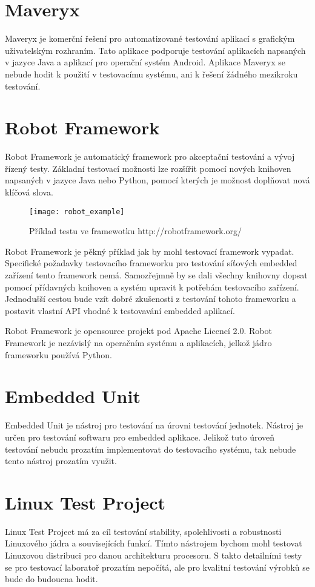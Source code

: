 \section{Maveryx}
Maveryx je komerční řešení pro automatizované testování aplikací s grafickým uživatelským rozhraním. Tato aplikace podporuje testování aplikacích napsaných v jazyce Java a aplikací pro operační systém Android. Aplikace Maveryx se nebude hodit k použití v testovacímu systému, ani k řešení žádného mezikroku testování.

\section{Robot Framework}
Robot Framework je automatický framework pro akceptační testování a vývoj řízený testy. Základní testovací možnosti lze rozšířit pomocí nových knihoven napsaných v jazyce Java nebo Python, pomocí kterých je možnost doplňovat nová klíčová slova.

\begin{figure}[h]
  \centering
  \texttt{[image: robot\_example]}
  \caption{Příklad testu ve framewotku http://robotframework.org/}
  \label{fig:robot_example}
\end{figure}

Robot Framework je pěkný příklad jak by mohl testovací framework vypadat. Specifické požadavky testovacího frameworku pro testování síťových embedded zařízení tento framework nemá. Samozřejmně by se dali všechny knihovny dopsat pomocí přídavných knihoven a systém upravit k potřebám testovacího zařízení. Jednodušší cestou bude vzít dobré zkušenosti z testování tohoto frameworku a postavit vlastní API vhodné k testovavání embedded aplikací.

Robot Framework je opensource projekt pod Apache Licencí 2.0. Robot Framework je nezávislý na operačním systému a aplikacích, jelkož jádro frameworku používá Python.

\section{Embedded Unit}
Embedded Unit je nástroj pro testování na úrovni testování jednotek. Nástroj je určen pro testování softwaru pro embedded aplikace. Jelikož tuto úroveň testování nebudu prozatím implementovat do testovacího systému, tak nebude tento nástroj prozatím využit.

\section{Linux Test Project}
Linux Test Project má za cíl testování stability, spolehlivosti a robustnosti Linuxového jádra a souvisejících funkcí. Tímto nástrojem bychom mohl testovat Linuxovou distribuci pro danou architekturu procesoru. S takto detailními testy se pro testovací laboratoř prozatím nepočítá, ale pro kvalitní testování výrobků se bude do budoucna hodit.

